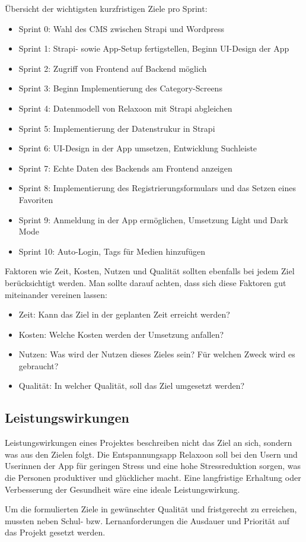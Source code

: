 Übersicht der wichtigsten kurzfristigen Ziele pro Sprint:
\begin{itemize}
      \item Sprint 0: Wahl des CMS zwischen Strapi und Wordpress
      \item Sprint 1: Strapi- sowie App-Setup fertigstellen, Beginn UI-Design der App
      \item Sprint 2: Zugriff von Frontend auf Backend möglich
      \item Sprint 3: Beginn Implementierung des Category-Screens
      \item Sprint 4: Datenmodell von Relaxoon mit Strapi abgleichen
      \item Sprint 5: Implementierung der Datenstrukur in Strapi
      \item Sprint 6: UI-Design in der App umsetzen, Entwicklung Suchleiste
      \item Sprint 7: Echte Daten des Backends am Frontend anzeigen
      \item Sprint 8: Implementierung des Registrierungsformulars und das Setzen eines Favoriten 
      \item Sprint 9: Anmeldung in der App ermöglichen, Umsetzung Light und Dark Mode
      \item Sprint 10: Auto-Login, Tags für Medien hinzufügen
\end{itemize}

Faktoren wie Zeit, Kosten, Nutzen und Qualität sollten ebenfalls bei jedem Ziel berücksichtigt werden. Man
sollte darauf achten, dass sich diese Faktoren gut miteinander vereinen lassen:
\begin{itemize}
      \item Zeit: Kann das Ziel in der geplanten Zeit erreicht werden?
      \item Kosten: Welche Kosten werden der Umsetzung anfallen?
      \item Nutzen: Was wird der Nutzen dieses Zieles sein? Für welchen Zweck wird es gebraucht?
      \item Qualität: In welcher Qualität, soll das Ziel umgesetzt werden?
\end{itemize}

\subsection{Leistungswirkungen}

Leistungswirkungen eines Projektes beschreiben nicht das Ziel an sich, sondern was aus den Zielen folgt.
Die Entspannungsapp Relaxoon soll bei den Usern und Userinnen der App für geringen Stress und eine hohe
Stressreduktion sorgen, was die Personen produktiver und glücklicher macht. Eine langfristige Erhaltung oder
Verbesserung der Gesundheit wäre eine ideale Leistungswirkung. 

Um die formulierten Ziele in gewünschter Qualität und fristgerecht zu erreichen, mussten
neben Schul- bzw. Lernanforderungen die Ausdauer und Priorität auf das Projekt
gesetzt werden.
